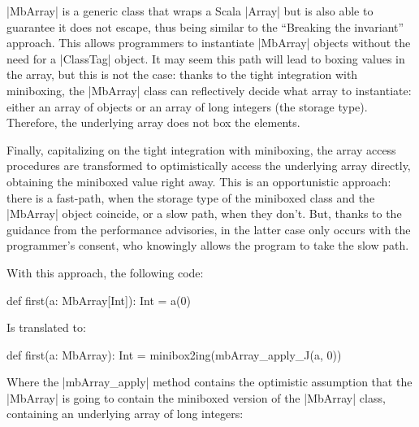 

|MbArray| is a generic class that wraps a Scala |Array| but is also able to guarantee it does not escape, thus being similar to the ``Breaking the invariant'' approach. This allows programmers to instantiate |MbArray| objects without the need for a |ClassTag| object. It may seem this path will lead to boxing values in the array, but this is not the case: thanks to the tight integration with miniboxing, the |MbArray| class can reflectively decide what array to instantiate: either an array of objects or an array of long integers (the storage type). Therefore, the underlying array does not box the elements.

Finally, capitalizing on the tight integration with miniboxing, the array access procedures are transformed to optimistically access the underlying array directly, obtaining the miniboxed value right away. This is an opportunistic approach: there is a fast-path, when the storage type of the miniboxed class and the |MbArray| object coincide, or a slow path, when they don't. But, thanks to the guidance from the performance advisories, in the latter case only occurs with the programmer's consent, who knowingly allows the program to take the slow path.

With this approach, the following code:

\begin{lstlisting-nobreak}
 def first(a: MbArray[Int]): Int = a(0)
\end{lstlisting-nobreak}

Is translated to:

\begin{lstlisting-nobreak}
 def first(a: MbArray): Int =
   minibox2ing(mbArray_apply_J(a, 0))
\end{lstlisting-nobreak}

Where the |mbArray_apply| method contains the optimistic assumption that the |MbArray| is going to contain the miniboxed version of the |MbArray| class, containing an underlying array of long integers:

